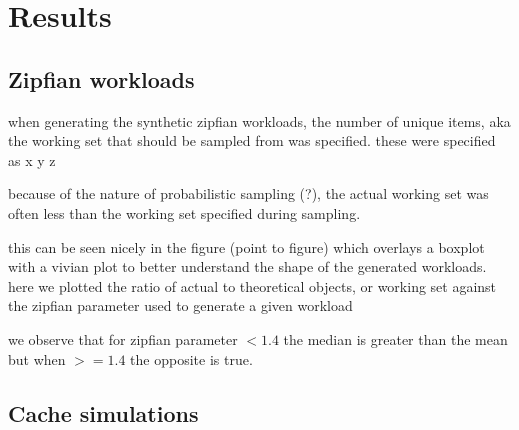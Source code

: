\chapter{Results}

\section{Zipfian workloads}

when generating the synthetic zipfian workloads, the number of unique items, aka the working set that should be sampled from was specified. these were specified as x y z

because of the nature of probabilistic sampling (?), the actual working set was often less than the working set specified during sampling. 

this can be seen nicely in the figure (point to figure) which overlays a boxplot with a vivian plot to better understand the shape of the generated workloads. here we plotted the ratio of actual to theoretical objects, or working set against the zipfian parameter used to generate a given workload


we observe that for zipfian parameter $<  1.4$ the median is greater than the mean but when $>= 1.4$ the opposite is true. 


\section{Cache simulations}
